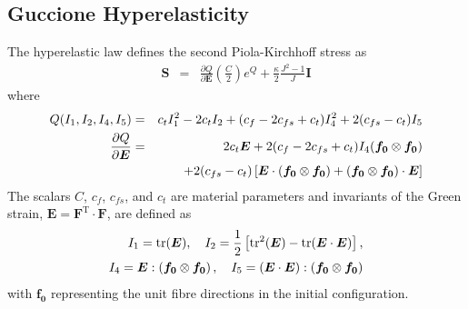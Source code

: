 \documentclass[sn-mathphys,Numbered]{sn-jnl}%
\begin{document}
\begin{appendices}
\subsection{Guccione Hyperelasticity}
The \citet{Guccione1995} hyperelastic law defines the second Piola-Kirchhoff stress as
\begin{eqnarray}
	\boldsymbol{S}
		&=& \frac{\partial Q}{\partial \boldsymbol{E} } \left( \frac{C}{2} \right) e^Q + \frac{\kappa}{2} \frac{J^2 - 1}{J} \textbf{I} 
\end{eqnarray}
where
\begin{eqnarray}
	Q(I_1, I_2, I_4, I_5) &=& c_t I_1^2 - 2 c_t I_2 + (c_f - 2c_{fs} + c_t) I_4^2   + 2(c_{fs} - c_t) I_5 \\
	\frac{\partial Q}{\partial \boldsymbol{E} }
		&=&  2 c_t \boldsymbol{E} + 2(c_f - 2 c_{fs} + c_t)I_4 ( \boldsymbol{f_0} \otimes \boldsymbol{f_0} ) \notag \\
		&&+ 2(c_{fs} - c_t)\left[\boldsymbol{E} \cdot  (\boldsymbol{f_0} \otimes \boldsymbol{f_0}) + ( \boldsymbol{f_0} \otimes \boldsymbol{f_0} ) \cdot \boldsymbol{E} \right]
\end{eqnarray}
The scalars $C$, $c_f$, $c_{fs}$, and $c_t$ are material parameters and invariants of the Green strain, $\boldsymbol{E} = \boldsymbol{F}^{\text{T}} \cdot \boldsymbol{F}$, are defined as
\begin{eqnarray}
	I_1 = \text{tr}(\boldsymbol{E}), \quad
	I_2 =  \frac{1}{2} \left[ \text{tr}^2(\boldsymbol{E}) - \text{tr}(\boldsymbol{E} \cdot \boldsymbol{E}) \right], \notag \\
	I_4 = \boldsymbol{E}  : \left( \boldsymbol{f_0} \otimes \boldsymbol{f_0} \right), \quad 
	I_5 = \left( \boldsymbol{E} \cdot \boldsymbol{E} \right): \left( \boldsymbol{f_0} \otimes \boldsymbol{f_0} \right)
\end{eqnarray}
with $\boldsymbol{f_0}$ representing the unit fibre directions in the initial configuration.


\end{appendices}
\end{document}

